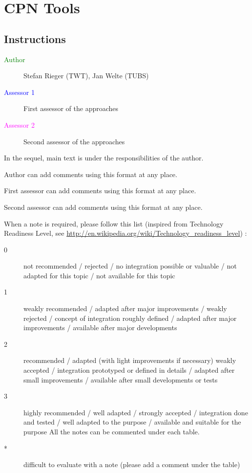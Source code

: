 \chapter{CPN Tools}
\label{sec:cpntools}

\section{Instructions}

\begin{description}
\item[\textcolor{green}{Author}] Stefan Rieger (TWT), Jan Welte (TUBS)
\item[\textcolor{blue}{Assessor 1}] First assessor of the approaches 
\item[\textcolor{magenta}{Assessor 2}] Second assessor of the approaches 
\end{description}

In the sequel, main text is under the responsibilities of the author.

\begin{author_comment}
Author can add comments using this format at any place.
\end{author_comment}

\begin{assessor1}
First assessor can add comments using this format at any place.
\end{assessor1}

\begin{assessor2}
Second assessor can add comments using this format at any place.
\end{assessor2}

When a note is required, please follow this list (inspired from Technology Readiness Level, see \url{http://en.wikipedia.org/wiki/Technology\_readiness\_level}) :

\begin{description}
\item[0] not recommended / rejected / no integration possible or valuable / not adapted for this topic / not available for this topic
\item[1] weakly recommended / adapted after major improvements / weakly rejected / concept of integration roughly defined / adapted after major improvements / available after major developments
\item[2] recommended / adapted (with light improvements if necessary)  weakly accepted / integration prototyped or defined in details / adapted after small improvements / available after small developments or tests
\item[3] highly recommended / well adapted / strongly accepted / integration done and tested / well adapted to the purpose / available and suitable for the purpose All the notes can be commented under each table.
\item[*] difficult to evaluate with a note (please add a comment under the table)
\end{description}


